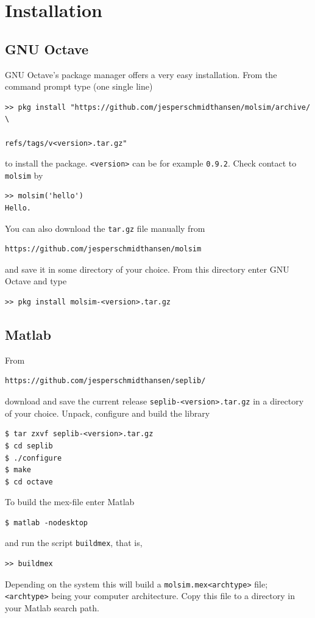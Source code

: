 \documentclass[11pt]{article}
\begin{document}
\section{Installation}
\subsection{GNU Octave}
GNU Octave's package manager offers a very easy installation. From the command
prompt type (one single line)
\begin{verbatim} 
>> pkg install "https://github.com/jesperschmidthansen/molsim/archive/ \
                                             refs/tags/v<version>.tar.gz"
\end{verbatim}
to install the package. \verb!<version>! can be for example \verb!0.9.2!. Check
contact to \verb!molsim! by
\begin{verbatim}
>> molsim('hello')
Hello. 
\end{verbatim}
You can also download the \verb!tar.gz! file manually from
\begin{verbatim}
https://github.com/jesperschmidthansen/molsim
\end{verbatim}
and save it in some directory of your choice. From this directory enter GNU
Octave and type
\begin{verbatim}
>> pkg install molsim-<version>.tar.gz 
\end{verbatim}
    
\subsection{Matlab}
From
\begin{verbatim}
https://github.com/jesperschmidthansen/seplib/
\end{verbatim}
\noindent download and save the current release \verb!seplib-<version>.tar.gz!
in a directory of your choice. Unpack, configure and build the library
\begin{verbatim}
$ tar zxvf seplib-<version>.tar.gz
$ cd seplib
$ ./configure
$ make
$ cd octave
\end{verbatim}
To build the \textsf{mex}-file enter Matlab
\begin{verbatim}
$ matlab -nodesktop
\end{verbatim}
and run the script \verb!buildmex!, that is, 
\begin{verbatim}
>> buildmex
\end{verbatim}
Depending on the system this will build a \verb!molsim.mex<archtype>!  file;
\verb!<archtype>! being your computer architecture. Copy this file to a
directory in your Matlab search path.
\end{document}
